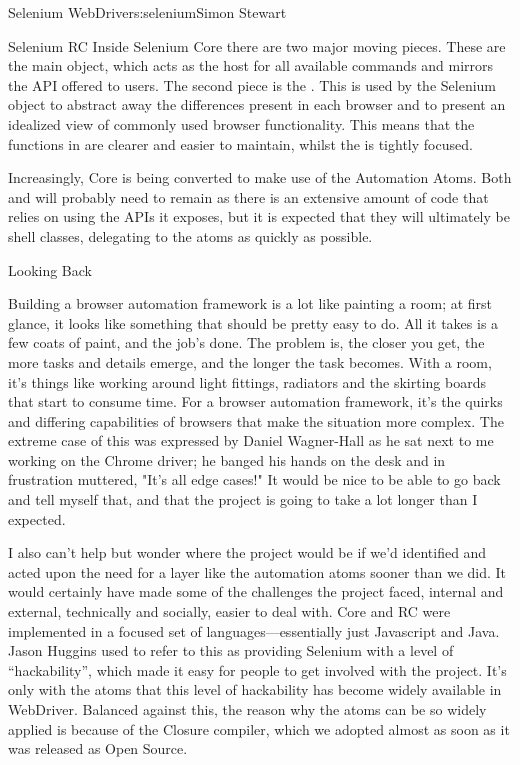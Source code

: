 \begin{aosachapter}{Selenium WebDriver}{s:selenium}{Simon Stewart}
\begin{aosasect1}{Selenium RC}
Inside Selenium Core there are two major moving pieces. These are the
main  object, which acts as the host for all available
commands and mirrors the API offered to users. The second piece is the
. This is used by the Selenium object to abstract
away the differences present in each browser and to present an
idealized view of commonly used browser functionality. This means that
the functions in  are clearer and easier to maintain,
whilst the  is tightly focused.

Increasingly, Core is being converted to make use of the Automation
Atoms. Both  and  will probably need
to remain as there is an extensive amount of code that relies on using
the APIs it exposes, but it is expected that they will ultimately be
shell classes, delegating to the atoms as quickly as possible.

\end{aosasect1}

\begin{aosasect1}{Looking Back}

Building a browser automation framework is a lot like painting a room;
at first glance, it looks like something that should be pretty easy to
do.  All it takes is a few coats of paint, and the job's done. The
problem is, the closer you get, the more tasks and details emerge, and
the longer the task becomes. With a room, it's things like working
around light fittings, radiators and the skirting boards that start to
consume time.  For a browser automation framework, it's the quirks and
differing capabilities of browsers that make the situation more
complex. The extreme case of this was expressed by Daniel Wagner-Hall
as he sat next to me working on the Chrome driver; he banged his hands
on the desk and in frustration muttered, "It's all edge cases!" It
would be nice to be able to go back and tell myself that, and that the
project is going to take a lot longer than I expected.

I also can't help but wonder where the project would be if we'd
identified and acted upon the need for a layer like the automation
atoms sooner than we did. It would certainly have made some of the
challenges the project faced, internal and external, technically and
socially, easier to deal with. Core and RC were implemented in a
focused set of languages---essentially just Javascript and Java. Jason
Huggins used to refer to this as providing Selenium with a level of
``hackability'', which made it easy for people to get involved with
the project. It's only with the atoms that this level of hackability
has become widely available in WebDriver. Balanced against this, the
reason why the atoms can be so widely applied is because of the
Closure compiler, which we adopted almost as soon as it was released
as Open Source.


\end{aosasect1}
\end{aosachapter}
